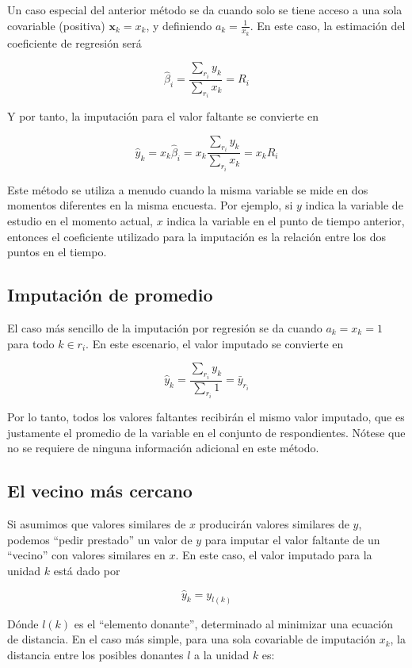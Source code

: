\documentclass[
  12pt,
]{book}
\begin{document}
Un caso especial del anterior método se da cuando solo se tiene acceso a una sola covariable (positiva) \(\mathbf{x}_k = x_k\), y definiendo \(a_k = \frac{1}{x_k}\). En este caso, la estimación del coeficiente de regresión será

\[
\hat{{\beta}}_i = \frac{\sum_{r_i}y_k}{\sum_{r_i}x_k} = R_i
\]

Y por tanto, la imputación para el valor faltante se convierte en

\[
\hat{y}_k = x_k \hat{\beta}_i = x_k \frac{\sum_{r_i}y_k}{\sum_{r_i}x_k} = x_k R_i
\]

Este método se utiliza a menudo cuando la misma variable se mide en dos momentos diferentes en la misma encuesta. Por ejemplo, si \(y\) indica la variable de estudio en el momento actual, \(x\) indica la variable en el punto de tiempo anterior, entonces el coeficiente utilizado para la imputación es la relación entre los dos puntos en el tiempo.

\hypertarget{imputaciuxf3n-de-promedio}{%
\subsection{Imputación de promedio}\label{imputaciuxf3n-de-promedio}}

El caso más sencillo de la imputación por regresión se da cuando \(a_k = x_k = 1\) para todo \(k \in r_i\). En este escenario, el valor imputado se convierte en

\[
\hat{y}_k  = \frac{\sum_{r_i}y_k}{\sum_{r_i}1}= \bar{y}_{r_i}
\]

Por lo tanto, todos los valores faltantes recibirán el mismo valor imputado, que es justamente el promedio de la variable en el conjunto de respondientes. Nótese que no se requiere de ninguna información adicional en este método.

\hypertarget{el-vecino-muxe1s-cercano}{%
\subsection{El vecino más cercano}\label{el-vecino-muxe1s-cercano}}

Si asumimos que valores similares de \(x\) producirán valores similares de \(y\), podemos ``pedir prestado'' un valor de \(y\) para imputar el valor faltante de un ``vecino'' con valores similares en \(x\). En este caso, el valor imputado para la unidad \(k\) está dado por

\[
\hat{y}_k = y_{l(k)}
\]

Dónde \(l(k)\) es el ``elemento donante'', determinado al minimizar una ecuación de distancia. En el caso más simple, para una sola covariable de imputación \(x_k\), la distancia entre los posibles donantes \(l\) a la unidad \(k\) es:
\end{document}
